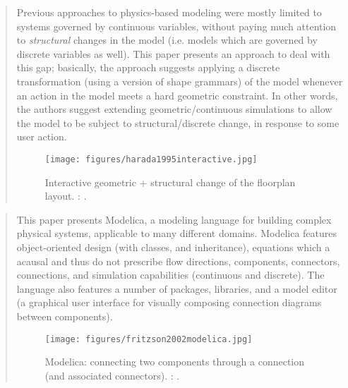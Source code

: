 		\begin{quote}
		\small
		Previous approaches to physics-based modeling were mostly limited to systems
		governed by continuous variables, without paying much attention to {\em structural}
		changes in the model (i.e. models which are governed by discrete variables as well). 
		This paper presents an approach to deal with this gap; basically, the approach
		suggests applying a discrete transformation (using a version of shape grammars) of the model 
		whenever an action in the model meets a hard geometric constraint.
		In other words, the authors suggest extending geometric/continuous simulations
		to allow the model to be subject to structural/discrete change, in response
		to some user action.
		
		\begin{figure}[htb]
		\centering
		\texttt{[image: figures/harada1995interactive.jpg]}
		\caption{
		Interactive geometric + structural change of the floorplan layout.
		\citeauthor{harada1995interactive}: 
		\cite{harada1995interactive}.}
		\label{fig:harada1995interactive}
		\end{figure}
		
		\end{quote}


		\begin{quote}
		\small
		This paper presents Modelica, a modeling language for building complex physical systems, 
		applicable to many different domains. Modelica features object-oriented design (with classes,
		and inheritance), equations which a acausal and thus do not prescribe flow directions,
		components, connectors, connections, and simulation capabilities (continuous and discrete).
		The language also features a number of packages, libraries, and a model editor (a graphical
		user interface for visually composing connection diagrams between components).
		
		\begin{figure}[htb]
		\centering
		\texttt{[image: figures/fritzson2002modelica.jpg]}
		\caption{
		Modelica: connecting two components through a connection (and associated connectors).
		\citeauthor{fritzson2002modelica}: 
		\cite{fritzson2002modelica}.}
		\label{fig:fritzson2002modelica}
		\end{figure}
		
		\end{quote}

